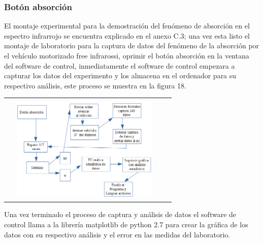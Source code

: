 \documentclass[12]{article}
\newenvironment{Figure}
{\par\medskip\noindent\minipage{\linewidth}}
{\endminipage\par\medskip}
\begin{document}
\begin{multicols}{2}
\subsubsection{Botón absorción}
El montaje experimental para la demostración del fenómeno de absorción en el espectro infrarrojo se encuentra explicado en el anexo C.3; una vez esta listo el montaje de laboratorio para la captura de datos del fenómeno de la absorción por el vehículo motorizado free infrarossi, oprimir el botón absorción en la ventana del software de control,  inmediatamente el software de control empezara a capturar los datos del experimento y los almacena en el ordenador para su respectivo análisis, este proceso se muestra en la figura 18.
\begin{Figure}	
\center
\begin{tabular}{|l|r|}
\hline\\
\includegraphics[width=8cm, height=5cm]{img/diagrama3.png} \\ \hline
\end{tabular}
\label{fig:g17}
\end{Figure}
Una vez terminado el proceso de captura y análisis de datos el software de control llama a la librería matplotlib de python 2.7 para crear la gráfica de los datos con su respectivo análisis y el error en las medidas del laboratorio.

\end{multicols}
\end{document}
